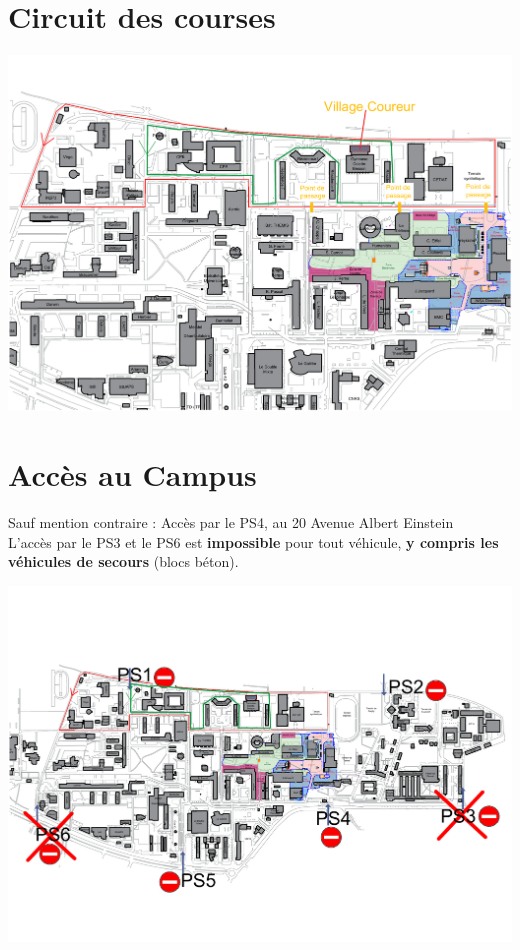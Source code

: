 \documentclass[hidelinks, paper=a4, fontsize=13pt]{report}
\begin{document}
\section{Circuit des courses}
	\begin{center}\includegraphics[width=.95\textheight, angle=90]{Exports/Plan_24h_45eme-Parcours_courses}\end{center}


\section{Accès au Campus}
Sauf mention contraire : Accès par le PS4, au 20 Avenue Albert Einstein\\
L'accès par le PS3 et le PS6 est \textbf{impossible} pour tout véhicule, \textbf{y compris les véhicules de secours} (blocs béton).
	\begin{center}\includegraphics[width=.9\textheight, angle=90]{Exports/Plan_24h_45eme-Points_Secu}\end{center}
\end{document}
